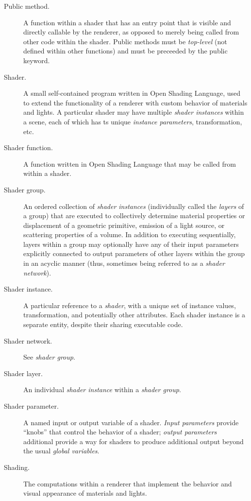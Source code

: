\documentclass[11pt,letterpaper]{book}
\def\langname{Open Shading Language\xspace}
\begin{document}
\begin{appendix}
\begin{description}
\item[Public method.] A function within a shader that has an entry point
  that is visible and directly callable by the renderer, as opposed to
  merely being called from other code within the shader.  Public methods
  must be \emph{top-level} (not defined within other functions) and must
  be preceeded by the {\cf public} keyword.

\item[Shader.] A small self-contained program written in \langname, used
  to extend the functionality of a renderer with custom behavior of
  materials and lights.  A particular shader may have multiple
  \emph{shader instances} within a scene, each of which has ts unique
  \emph{instance parameters}, transformation, etc.

\item[Shader function.] A function written in \langname that may be
  called from within a shader.

\item[Shader group.] An ordered collection of \emph{shader instances}
  (individually called the \emph{layers} of a group) that are executed
  to collectively determine material properties or displacement of a
  geometric primitive, emission of a light source, or scattering
  properties of a volume.  In addition to executing sequentially, layers
  within a group may optionally have any of their input parameters
  explicitly connected to output parameters of other layers within the
  group in an acyclic manner (thus, sometimes being referred to as a
  \emph{shader network}).

\item[Shader instance.] A particular reference to a \emph{shader}, with
  a unique set of {\cf instance values}, transformation, and potentially
  other attributes.  Each shader instance is a separate entity, despite
  their sharing executable code.

\item[Shader network.] See \emph{shader group}.

\item[Shader layer.] An individual \emph{shader instance} within a
  \emph{shader group}.

\item[Shader parameter.] A named input or output variable of a shader.
  \emph{Input parameters} provide ``knobs'' that control the behavior of
  a shader; \emph{output parameters} additional provide a way for
  shaders to produce additional output beyond the usual \emph{global
    variables}.

\item[Shading.] The computations within a renderer that implement the
  behavior and visual appearance of materials and lights.

\end{description}

\end{appendix}

\backmatter

%

\printindex
\end{document}
